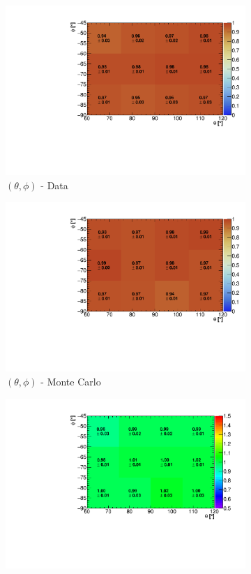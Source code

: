 \documentclass[a4paper,11pt]{article}
\begin{document}
\begin{figure}[htbp]
  \begin{subfigure}{0.32\textwidth}
    \includegraphics[width=\linewidth]{figures/e_theta_phi.pdf}
    \caption{$(\theta,\phi)$ - Data}
  \end{subfigure}\begin{subfigure}{0.32\textwidth}
  \includegraphics[width=\linewidth]{figures/theta_phi_mc.pdf}
  \caption{$(\theta,\phi)$ - Monte Carlo}
\end{subfigure}\begin{subfigure}{0.32\textwidth}
  \includegraphics[width=\linewidth]{figures/theta_phi.pdf}

\end{subfigure}
\end{figure}
\end{document}

